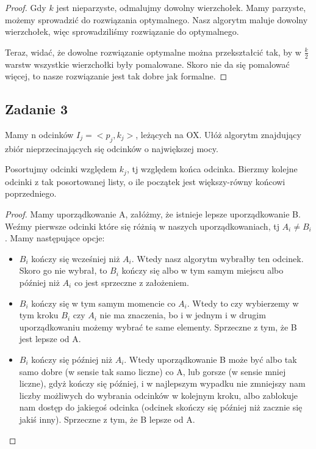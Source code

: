 \documentclass[a4paper]{article}
\begin{document}
\begin{proof}
Gdy $k$ jest nieparzyste, odmalujmy dowolny wierzchołek. Mamy parzyste, możemy sprowadzić do rozwiązania optymalnego. Nasz algorytm maluje dowolny wierzchołek, więc sprowadziliśmy rozwiązanie do optymalnego.

Teraz, widać, że dowolne rozwiązanie optymalne można przekształcić tak, by w $\frac{k}{2}$ warstw wszystkie wierzchołki były pomalowane. Skoro nie da się pomalować więcej, to nasze rozwiązanie jest tak dobre jak formalne.
\end{proof}

\subsection*{Zadanie 3}
Mamy n odcinków $I_j=<p_j,k_j>$, leżących na OX. Ułóż algorytm znajdujący zbiór nieprzecinających się odcinków o największej mocy.


Posortujmy odcinki względem $k_j$, tj względem końca odcinka. Bierzmy kolejne odcinki z tak posortowanej listy, o ile początek jest większy-równy końcowi poprzedniego.
\begin{proof}

Mamy uporządkowanie A, załóżmy, że istnieje lepsze uporządkowanie B. Weźmy pierwsze odcinki które się różnią w naszych uporządkowaniach, tj $A_i\neq B_i$. Mamy następujące opcje:
\begin{itemize}
\clearpage
\item $B_i$ kończy się wcześniej niż $A_i$. Wtedy nasz algorytm wybrałby ten odcinek. Skoro go nie wybrał, to $B_i$ kończy się albo w tym samym miejscu albo później niż $A_i$ co jest sprzeczne z założeniem.
\item $B_i$ kończy się w tym samym momencie co $A_i$. Wtedy to czy wybierzemy w tym kroku $B_i$ czy $A_i$ nie ma znaczenia, bo i w jednym i w drugim uporządkowaniu możemy wybrać te same elementy. Sprzeczne z tym, że B jest lepsze od A.
\item $B_i$ kończy się później niż $A_i$. Wtedy uporządkowanie B może być albo tak samo dobre (w sensie tak samo liczne) co A, lub gorsze (w sensie mniej liczne), gdyż kończy się później, i w najlepszym wypadku nie zmniejszy nam liczby możliwych do wybrania odcinków w kolejnym kroku, albo zablokuje nam dostęp do jakiegoś odcinka (odcinek skończy się później niż zacznie się jakiś inny). Sprzeczne z tym, że B lepsze od A.
\end{itemize}

\end{proof}
\end{document}

